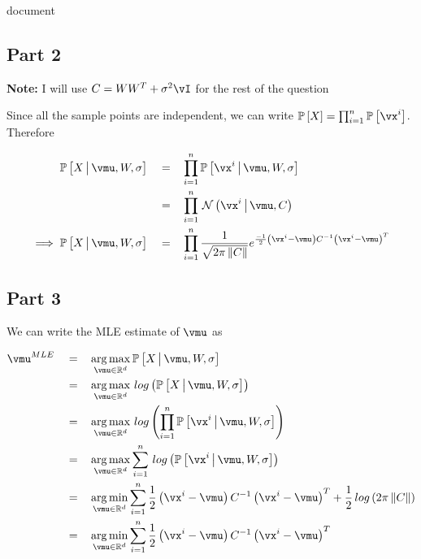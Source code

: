 document\documentclass{article}
\begin{document}
\begin{mlsolution}
\begin{addmargin}{1.5em}
	\end{addmargin}

	\subsection*{Part 2}
	\begin{addmargin}{1.5em}

		\textbf{Note:} I will use $C = W W^T + \sigma^2 \iden$ for the rest of the question

		Since all the sample points are independent, we can write $\prob{X} = \prod_{i = 1}^{n} \prob{\vx^i}$. Therefore

		\begin{align*}
			\prob{X \pipe \vmu, W, \sigma}			\eq&	\prod_{i = 1}^{n} \prob{\vx^i \pipe \vmu, W, \sigma} \\
													\eq&	\prod_{i = 1}^{n} \ND{\vx^i \pipe \vmu, C} \\
			\implies \prob{X \pipe \vmu, W, \sigma}	\eq&	\prod_{i = 1}^{n} \frac{1}{\sqrt{2 \pi \norm{C}}} \exp{\frac{-1}{2} \para{\vx^i - \vmu} C^{-1} \para{\vx^i - \vmu}^T}
		\end{align*}

	\end{addmargin}

	\subsection*{Part 3}
	\begin{addmargin}{1.5em}

		We can write the MLE estimate of $\vmu$ as

		\begin{align*}
			\vmu^{MLE}	\eq&	\argmax_{\vmu \in \R^d} \prob{X \pipe \vmu, W, \sigma} \\
						\eq&	\argmax_{\vmu \in \R^d} \log{\prob{X \pipe \vmu, W, \sigma}} \\
						\eq&	\argmax_{\vmu \in \R^d} \log{\prod_{i = 1}^{n} \prob{\vx^i \pipe \vmu, W, \sigma}} \\
						\eq&	\argmax_{\vmu \in \R^d} \sum_{i = 1}^{n} \log{\prob{\vx^i \pipe \vmu, W, \sigma}} \\
						\eq&	\argmin_{\vmu \in \R^d} \sum_{i = 1}^{n} \frac{1}{2} \para{\vx^i - \vmu} C^{-1} \para{\vx^i - \vmu}^T + \frac{1}{2} \log{2 \pi \norm{C}} \\
						\eq&	\argmin_{\vmu \in \R^d}	\sum_{i = 1}^{n} \frac{1}{2} \para{\vx^i - \vmu} C^{-1} \para{\vx^i - \vmu}^T
		\end{align*}


\end{addmargin}
\end{mlsolution}
\end{document}
